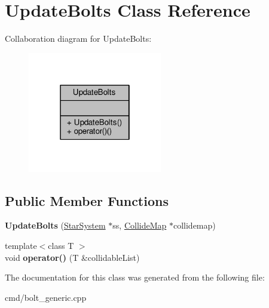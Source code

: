 \hypertarget{classUpdateBolts}{}\section{Update\+Bolts Class Reference}
\label{classUpdateBolts}


Collaboration diagram for Update\+Bolts\+:
\nopagebreak
\begin{figure}[H]
\begin{center}
\leavevmode
\includegraphics[width=166pt]{d6/db8/classUpdateBolts__coll__graph}
\end{center}
\end{figure}
\subsection*{Public Member Functions}
\begin{DoxyCompactItemize}
\item 
{\bfseries Update\+Bolts} (\hyperlink{classStarSystem}{Star\+System} $\ast$ss, \hyperlink{classCollideMap}{Collide\+Map} $\ast$collidemap)\hypertarget{classUpdateBolts_a6f2830c2057cfe6ae0f5df1ef70ca1a9}{}\label{classUpdateBolts_a6f2830c2057cfe6ae0f5df1ef70ca1a9}

\item 
{\footnotesize template$<$class T $>$ }\\void {\bfseries operator()} (T \&collidable\+List)\hypertarget{classUpdateBolts_a3c3387752a6575e08710c9ca9f019e74}{}\label{classUpdateBolts_a3c3387752a6575e08710c9ca9f019e74}

\end{DoxyCompactItemize}


The documentation for this class was generated from the following file\+:\begin{DoxyCompactItemize}
\item 
cmd/bolt\+\_\+generic.\+cpp\end{DoxyCompactItemize}
